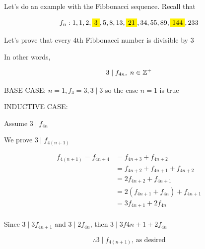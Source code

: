 \documentclass[../../Main.tex]{subfiles}
\begin{document}
\begin{example}
    Let's do an example with the Fibbonacci sequence. Recall that

    $$f_n: 1, 1, 2, \yellowbox{3}, 5, 8, 13, \yellowbox{21}, 34, 55, 89, \yellowbox{144}, 233$$

    Let's prove that every 4th Fibbonacci number is divisible by 3

    In other words,

    $$3 \mid f_{4n}, \; n \in \mathbb{Z}^+$$

    \begin{poof}
        BASE CASE: $n = 1, f_4 = 3, 3 \mid 3$ so the case $n = 1$ is true

        INDUCTIVE CASE:

        Assume $3 \mid f_{4n}$

        We prove $3 \mid f_{4(n + 1)}$

        \begin{align*}
            f_{4(n + 1)} = f_{4n + 4} &= f_{4n + 3} + f_{4n + 2} \\
            &= f_{4n + 2} + f_{4n + 1} + f_{4n + 2} \\
            &= 2f_{4n + 2} + f_{4n + 1} \\
            &= 2\left( f_{4n + 1} + f_{4n} \right) + f_{4n + 1} \\
            &= 3 f_{4n + 1} + 2f_{4n} \\
        \end{align*}

        Since $3 \mid 3 f_{4n + 1}$ and $3 \mid 2f_{4n}$, then $3 \mid 3f{4n + 1} + 2f_{4n}$

        $$\therefore 3 \mid f_{4(n + 1)} \text{, as desired}$$
    \end{poof}
\end{example}

\end{document}

